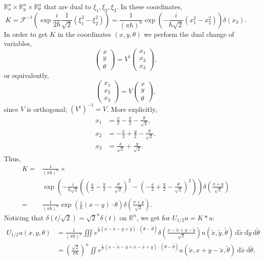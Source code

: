 \documentclass{article}
\newcommand{\DD}{\:\!\mathrm{d}}
\newcommand{\RM}{\mathbb{R}}
\newcommand{\h}{\hbar}
\begin{document}
$\RM^n_x\times \RM^n_y\times \RM^n_\theta $ that are dual to
$\xi _1,\xi _2,\xi _3$.  In these coordinates,
\[
K=\mathcal{F}^{-1}\left( \exp \frac{i}{2\h}\frac{1}{\sqrt{2}}\left(
    \xi _1^2-\xi _2^2 \right) \right) = \frac{1}{(\pi \h)^n}\exp
\left( -\frac{i}{\h\sqrt{2}} \left(x_1^2-x_2^2 \right) \right)\delta
(x_3).
\]
In order to get $K$ in the coordinates $(x,y,\theta )$ we perform the
dual change of variables,
\[
\begin{pmatrix} x \\ y\\
  \theta \end{pmatrix}=V^\mathrm{t}\begin{pmatrix}x_1 \\ x_2 \\
  x_3\end{pmatrix},
\]
or equivalently,
\[
\begin{pmatrix}x_1 \\ x_2 \\ x_3\end{pmatrix}=V
\begin{pmatrix} x \\ y\\
  \theta \end{pmatrix},
\]
since $V$ is orthogonal; $(V^\mathrm{t})^{-1}=V$. More explicitly,
\[
\begin{split}
  x_1&=\frac{x}{2}-\frac{y}{2}-\frac{\theta }{\sqrt{2}},\\
  x_2&=-\frac{x}{2}+\frac{y}{2}-\frac{\theta }{\sqrt{2}},\\
  x_3&=\frac{x}{\sqrt{2}}+\frac{y}{\sqrt{2}}.
\end{split}
\]
Thus,
\begin{equation}\label{dsa.5}
  \begin{split}
    K=&\frac{1}{(\pi \h)^n}\times\\ &\exp \left(-\frac{i}{\h\sqrt{2}}
      \left( \left( \frac{x}{2}-\frac{y}{2}-\frac{\theta
          }{\sqrt{2}}\right)^2-\left(-\frac{x}{2}+\frac{y}{2}-\frac{\theta
          }{\sqrt{2}} \right)^2\right) \right) \delta
    \left(\frac{x+y}{\sqrt{2}}
    \right)\\
    =&\frac{1}{(\pi \h)^n} \exp \left( \frac{i}{\h}(x-y)\cdot \theta
    \right) \delta \left(\frac{x+y}{\sqrt{2}} \right).
  \end{split}
\end{equation}
Noticing that $\delta (t/\sqrt{2})=\sqrt{2}^n\delta (t)$ on $\RM^n$,
we get for $U_{1/2}u=K*u$:
\[
\begin{split}
  U_{1/2}u(x,y,\theta ) & =\frac{1}{(\pi \h)^n}\iiint
  e^{\frac{i}{\h}(x-\widetilde{x}-y+\widetilde{y})\cdot (\theta
    -\widetilde{\theta })}\delta
  \left(\frac{x-\widetilde{x}+y-\widetilde{y}}{\sqrt{2}}
  \right)u(\widetilde{x},\widetilde{y},\widetilde{\theta
  })\DD\widetilde{x}\DD\widetilde{y}\DD\widetilde{\theta }\\
  & = \left( \frac{\sqrt{2}}{\pi \h} \right)^n \iint
  e^{\frac{i}{\h}(x-\widetilde{x}-y+x-\widetilde{x}+y)\cdot (\theta
    -\widetilde{\theta })}
  u(\widetilde{x},x+y-\widetilde{x},\widetilde{\theta})
  \DD\widetilde{x}\DD\widetilde{\theta },
\end{split}
\]
\end{document}
